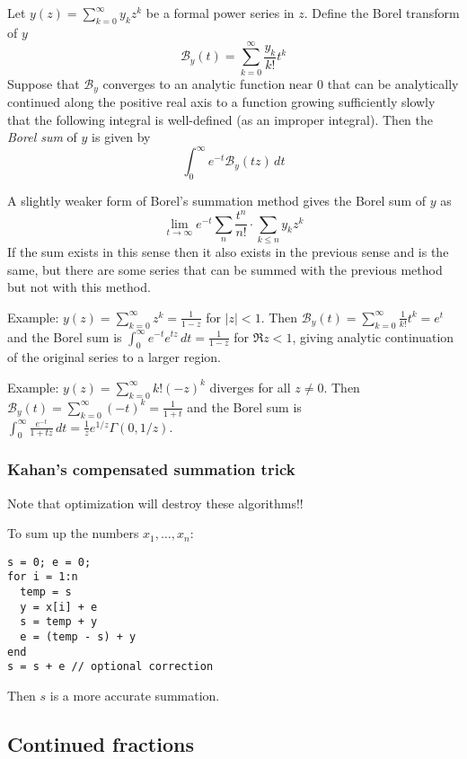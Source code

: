 \documentclass[10pt,dvipdfmx,letterpaper,twoside]{article}
\let\Gam=\Gamma
\begin{document}
Let $y(z)=\sum_{k=0}^\infty y_k z^k$ be a formal power series in $z$.  Define the Borel transform of $y$
\[ \mathcal{B}_y(t) = \sum_{k=0}^\infty \frac{y_k}{k!} t^k \]
Suppose that $\mathcal{B}_y$ converges to an analytic function near $0$ that can be analytically continued
along the positive real axis to a function growing sufficiently slowly that the following integral is
well-defined (as an improper integral).  Then the {\em Borel sum} of $y$ is given by
\[ \int_0^\infty e^{-t}\mathcal{B}_y(tz)\,dt \]

A slightly weaker form of Borel's summation method gives the Borel sum of $y$ as
\[ \lim_{t\to\infty}e^{-t}\sum_{n}\frac{t^n}{n!}\cdot\sum_{k\leq n} y_k z^k \]
If the sum exists in this sense then it also exists in the previous sense and is the same, but there are some
series that can be summed with the previous method but not with this method.

Example: $y(z)=\sum_{k=0}^\infty z^k = \frac{1}{1-z}$ for $|z|<1$.  Then $\mathcal{B}_y(t) = \sum_{k=0}^\infty\frac{1}{k!}t^k = e^t$ and
the Borel sum is $\int_0^\infty e^{-t}e^{tz}\,dt = \frac{1}{1-z}$ for $\Re z<1$, giving analytic continuation of
the original series to a larger region.

Example: $y(z)=\sum_{k=0}^\infty k!(-z)^k$ diverges for all $z\neq0$.  Then $\mathcal{B}_y(t) = \sum_{k=0}^\infty(-t)^k = \frac{1}{1+t}$ and
the Borel sum is $\int_0^\infty\frac{e^{-t}}{1+tz}\,dt = \frac1z e^{1/z} \Gam(0,1/z)$.

\subsubsection{Kahan's compensated summation trick}
Note that optimization will destroy these algorithms!!

To sum up the numbers $x_1, \dots, x_n$:
\begin{verbatim}
s = 0; e = 0;
for i = 1:n
  temp = s
  y = x[i] + e
  s = temp + y
  e = (temp - s) + y
end
s = s + e // optional correction
\end{verbatim}
Then $s$ is a more accurate summation.
%

\subsection{Continued fractions}
\end{document}
